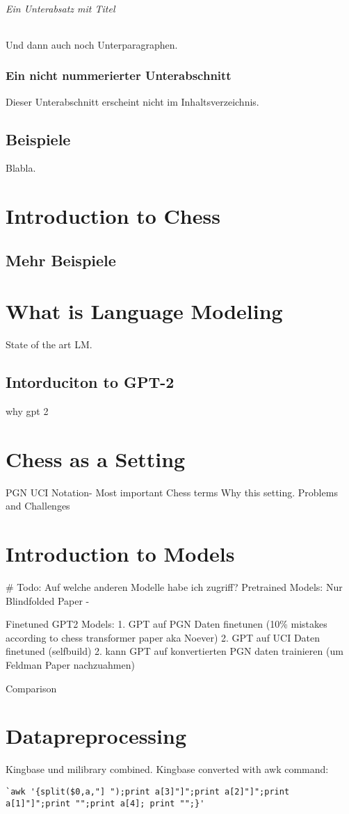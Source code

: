 \documentclass[11pt,a4paper,twoside,openright]{scrbook}
\begin{document}
\subparagraph{Ein Unterabsatz mit Titel}
Und dann auch noch Unterparagraphen.

\subsection*{Ein nicht nummerierter Unterabschnitt}
Dieser Unterabschnitt erscheint nicht im Inhaltsverzeichnis.
\newpage

\section{Beispiele}
Blabla.
\newpage

\chapter{Introduction to Chess}
\section{Mehr Beispiele}
\chapter{What is Language Modeling}
State of the art LM.
\section{Intorduciton to GPT-2}
why gpt 2
\chapter{Chess as a Setting}
PGN UCI Notation- Most important Chess terms
Why this setting. Problems and Challenges
\chapter{Introduction to Models}
# Todo: Auf welche anderen Modelle habe ich zugriff?
Pretrained Models:
Nur Blindfolded Paper -

Finetuned GPT2 Models:
1. GPT auf PGN Daten finetunen (10\% mistakes according to chess transformer paper aka Noever)
2. GPT auf UCI Daten finetuned (selfbuild)
2. kann GPT auf konvertierten PGN daten trainieren (um Feldman Paper nachzuahmen)

Comparison
\chapter{Datapreprocessing}
Kingbase und milibrary combined. Kingbase converted with awk command:
\begin{verbatim}
`awk '{split($0,a,"] ");print a[3]"]";print a[2]"]";print a[1]"]";print "";print a[4]; print "";}'
\end{verbatim}
\end{document}
